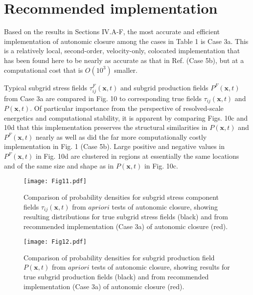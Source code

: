 \section{Recommended implementation}

Based on the results in Sections IV.A-F, the most accurate and efficient implementation of autonomic closure among the cases in Table 1 is Case 3a. This is a relatively local, second-order, velocity-only, colocated implementation that has been found here to be nearly as accurate as that in Ref.  \cite{king2016autonomic} (Case 5b), but at a computational cost that is $O(10^3)$ smaller.  

Typical subgrid stress fields  $\tau_{ij}^{F}(\mathbf{x},t)$ and subgrid production fields $P^{F}(\mathbf{x},t)$  from Case 3a are compared in Fig. 10 to corresponding true fields $\tau_{ij}(\mathbf{x},t)$  and $P(\mathbf{x},t)$. Of particular importance from the perspective of resolved-scale energetics and computational stability, it is apparent by comparing Figs. 10c and 10d that this implementation preserves the structural similarities in  $P(\mathbf{x},t)$ and $P^{F}(\mathbf{x},t)$  nearly as well as did the far more computationally costly implementation in Fig. 1 (Case 5b). Large positive and negative values in $P^{F}(\mathbf{x},t)$  in Fig. 10d are clustered in regions at essentially the same locations and of the same size and shape as in $P(\mathbf{x},t)$  in Fig. 10c. 

%
\begin{figure}
	\begin{center}
	\texttt{[image: Fig11.pdf]}
	\caption{Comparison of probability densities for subgrid stress component fields $\tau_{ij}(\mathbf{x},t)$ from $a priori$ tests of autonomic closure, showing resulting distributions for true subgrid stress fields (black) and from recommended implementation (Case 3a) of autonomic closure (red).}
	\label{F:11}
	\end{center}
\end{figure}
%
%
%
\begin{figure}
	\begin{center}
	\texttt{[image: Fig12.pdf]}
	\caption{Comparison of probability densities for subgrid production field $P(\mathbf{x},t)$ from $a priori$ tests of autonomic closure, showing results for true subgrid production fields (black) and from recommended implementation (Case 3a) of autonomic closure (red).}
	\label{F:12}
	\end{center}
\end{figure}
%
%

